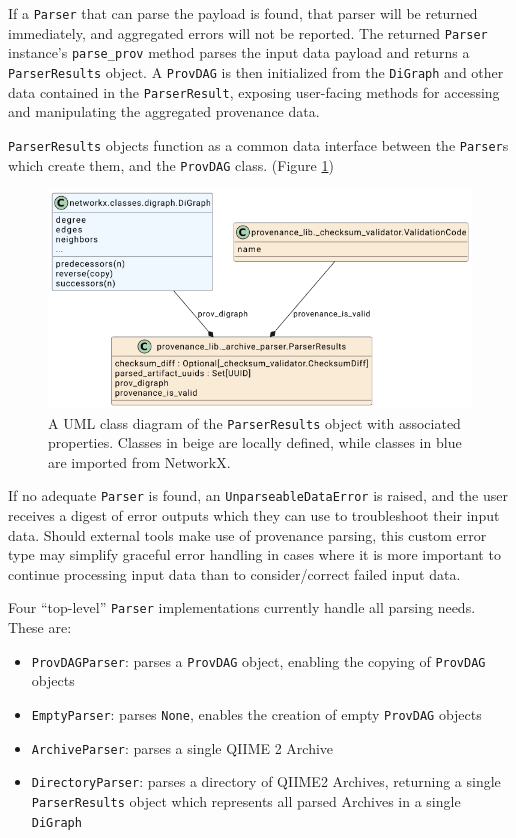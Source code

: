 If a \texttt{Parser} that can parse the payload is found, that parser will be returned
immediately, and aggregated errors will not be reported. The returned \texttt{Parser}
instance’s \texttt{parse\_prov} method parses the input data payload and returns a
\texttt{ParserResults} object. A \texttt{ProvDAG} is then initialized from the \texttt{DiGraph} and other
data contained in the \texttt{ParserResult}, exposing user-facing methods for accessing
and manipulating the aggregated provenance data.

\texttt{ParserResults} objects function as a common data interface between the \texttt{Parser}s
which create them, and the \texttt{ProvDAG} class. (Figure \ref{fig:ParserResultsUML})

\begin{figure}[htp]
\centering
\includegraphics[width=\textwidth]{figures/ParserResultsUML.png}
\caption[UML Class diagram of the ParserResults class and its components]%
{A UML class diagram of the \texttt{ParserResults} object with associated properties.
Classes in beige are locally defined, while classes in blue are imported from
NetworkX.}
\label{fig:ParserResultsUML}
\end{figure}

If no adequate \texttt{Parser} is found, an \texttt{UnparseableDataError} is raised, and the user
receives a digest of error outputs which they can use to troubleshoot their
input data. Should external tools make use of provenance parsing, this custom
error type may simplify graceful error handling in cases where it is more
important to continue processing input data than to consider/correct failed
input data. 

Four “top-level” \texttt{Parser} implementations currently handle all parsing needs.
These are:
\begin{itemize}
    \item \texttt{ProvDAGParser}: parses a \texttt{ProvDAG} object, enabling the
        copying of \texttt{ProvDAG} objects
    \item \texttt{EmptyParser}: parses \texttt{None}, enables the creation of
        empty \texttt{ProvDAG} objects
    \item \texttt{ArchiveParser}: parses a single QIIME 2 Archive
    \item \texttt{DirectoryParser}: parses a directory of QIIME2 Archives,
        returning a single \texttt{ParserResults} object which represents all parsed
        Archives in a single \texttt{DiGraph}
\end{itemize}

